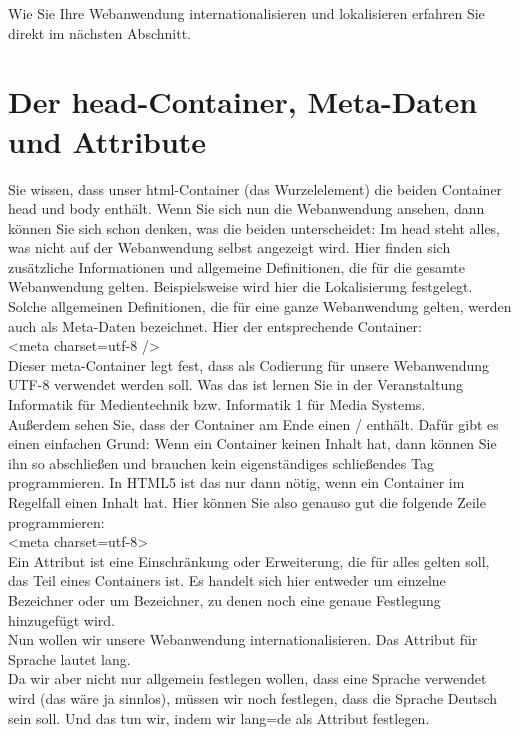 Wie Sie Ihre Webanwendung internationalisieren und lokalisieren erfahren Sie direkt im nächsten Abschnitt.

\section{Der head-Container, Meta-Daten und Attribute}

Sie wissen, dass unser html-Container (das Wurzelelement) die beiden Container head und body enthält. Wenn Sie sich nun die Webanwendung ansehen, dann können Sie sich schon denken, was die beiden unterscheidet: Im head steht alles, was nicht auf der Webanwendung selbst angezeigt wird. Hier finden sich zusätzliche Informationen und allgemeine Definitionen, die für die gesamte Webanwendung gelten. Beispielsweise wird hier die Lokalisierung festgelegt. Solche allgemeinen Definitionen, die für eine ganze Webanwendung gelten, werden auch als Meta-Daten bezeichnet. Hier der entsprechende Container:\\

<meta charset=utf-8 />\\

Dieser meta-Container legt fest, dass als Codierung für unsere Webanwendung UTF-8 verwendet werden soll. Was das ist lernen Sie in der Veranstaltung Informatik für Medientechnik bzw. Informatik 1 für Media Systems.\\

Außerdem sehen Sie, dass der Container am Ende einen / enthält. Dafür gibt es einen einfachen Grund: Wenn ein Container keinen Inhalt hat, dann können Sie ihn so abschließen und brauchen kein eigenständiges schließendes Tag programmieren. In HTML5 ist das nur dann nötig, wenn ein Container im Regelfall einen Inhalt hat. Hier können Sie also genauso gut die folgende Zeile programmieren:\\

<meta charset=utf-8>\\

Ein Attribut ist eine Einschränkung oder Erweiterung, die für alles gelten soll, das Teil eines Containers ist. Es handelt sich hier entweder um einzelne Bezeichner oder um Bezeichner, zu denen noch eine genaue Festlegung hinzugefügt wird.\\

Nun wollen wir unsere Webanwendung internationalisieren. Das Attribut für Sprache lautet lang.\\

Da wir aber nicht nur allgemein festlegen wollen, dass eine Sprache verwendet wird (das wäre ja sinnlos), müssen wir noch festlegen, dass die Sprache Deutsch sein soll. Und das tun wir, indem wir lang=de als Attribut festlegen.\\

